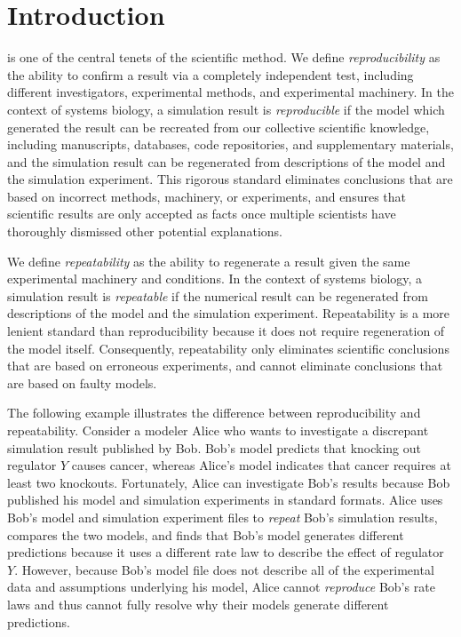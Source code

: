 \documentclass[journal,transmag,twoside]{IEEEtran}
\begin{document}
\section{Introduction}
% 
% 
% 
% 
 is one of the central tenets of the scientific method.
We define \textit{reproducibility} as the ability to confirm a result via a completely independent test, including different investigators, experimental methods, and experimental machinery. In the context of systems biology, a simulation result is \textit{reproducible} if the model which generated the result can be recreated from our collective scientific knowledge, including manuscripts, databases, code repositories, and supplementary materials, and the simulation result can be regenerated from descriptions of the model and the simulation experiment.
This rigorous standard eliminates conclusions that are based on incorrect methods, machinery, or experiments, and ensures that scientific results are only accepted as facts once multiple scientists have thoroughly dismissed other potential explanations. 

We define \textit{repeatability} as the ability to regenerate a result given the same experimental machinery and conditions. In the context of systems biology, a simulation result is \textit{repeatable} if the numerical result can be regenerated from descriptions of the model and the simulation experiment.
Repeatability is a more lenient standard than reproducibility because it does not require regeneration of the model itself. 
Consequently, repeatability only eliminates scientific conclusions that are based on erroneous experiments, and cannot eliminate conclusions that are based on faulty models.

The following example illustrates the difference between reproducibility and repeatability. Consider a modeler Alice who wants to investigate a discrepant simulation result published by Bob. Bob's model predicts that knocking out regulator $Y$ causes cancer, whereas Alice's model indicates that cancer requires at least two knockouts. Fortunately, Alice can investigate Bob's results because Bob published his model and simulation experiments in standard formats. Alice uses Bob's model and simulation experiment files to \textit{repeat} Bob's simulation results, compares the two models, and finds that Bob's model generates different predictions because it uses a different rate law to describe the effect of regulator $Y$. However, because Bob's model file does not describe all of the experimental data and assumptions underlying his model, Alice cannot \textit{reproduce} Bob's rate laws and thus cannot fully resolve why their models generate different predictions.
\end{document}
